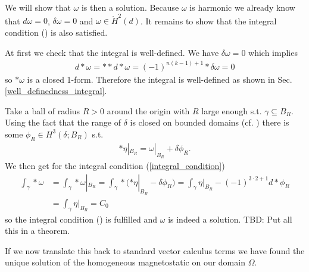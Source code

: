 \documentclass[12pt,a4paper]{article}
\theoremstyle{definition}
\newcommand{\omegabar}{\overline{\Omega}}
\begin{document}
We will show that $\omega$ is then a solution. Because $\omega$ is harmonic
we already know that $d\omega = 0$, $\delta \omega = 0$ and 
$\omega \in \mathring{H}^2(d)$. It remains to show that the integral condition
() is also satisfied.

At first we check that the integral is well-defined. We have $\delta \omega = 0$
which implies
\begin{align*}
    d * \omega = ** d*\omega = (-1)^{n(k-1)+1} *\delta \omega = 0
\end{align*}
so $*\omega$ is a closed 1-form. Therefore the integral is well-defined as shown
in Sec.\,\ref{well_definedness_integral}.

Take a ball of radius $R>0$ 
around the origin with $R$ large enough s.t. $\gamma \subseteq B_R$. 
Using the fact that the range of $\delta$ is closed on bounded domains 
(cf. \cite[Lemma 7]{picard}) there is some $\phi_R \in H^3(\delta;B_R)$ s.t.
\begin{align*}
    *\eta|_{B_R} = \omega|_{B_R} + \delta \phi_R.
\end{align*}
We then get for the integral condition (\ref{integral_condition}) 
\begin{align*}
    \int_\gamma *\omega &= \int_\gamma *\omega|_{B_R} = 
    \int_\gamma *(*\eta|_{B_R} - \delta \phi_R) = 
    \int_\gamma \eta|_{B_R} - (-1)^{3\cdot 2+1} d * \phi_R \\
    &= \int_\gamma \eta|_{B_R} = C_0
\end{align*}
so the integral condition () is fulfilled and 
$\omega$ is indeed a solution. \newline
{\color{red} TBD: Put all this in a theorem.}

If we now translate this back to standard vector calculus terms we have found 
the unique solution of the homogeneous magnetostatic on our domain $\Omega$.



\end{document}
